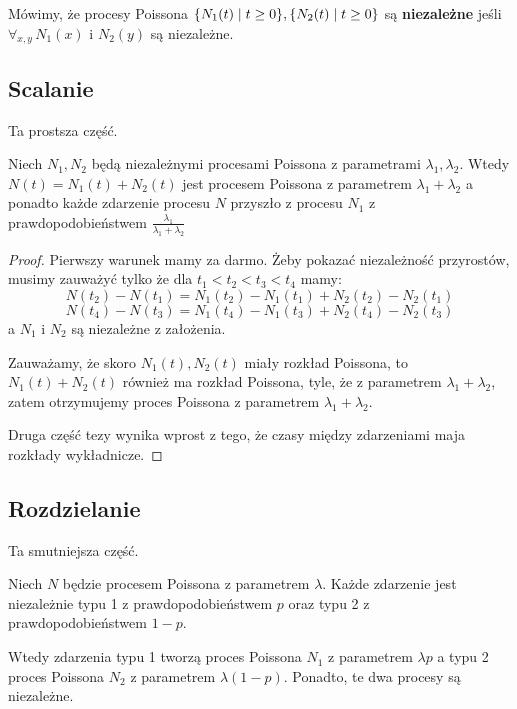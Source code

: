 \begin{definition}
	Mówimy, że procesy Poissona \(\set{N_1(t) \mid t \geq 0}, \set{N_2(t) \mid t \geq 0}\) są \textbf{niezależne} jeśli \(\forall_{x, y} \, N_1(x)\) i \(N_2(y)\) są niezależne.
\end{definition}

\subsection{Scalanie}
Ta prostsza część.
\begin{theorem}[Twierdzenie 8.12 P\&C]
	Niech \( N_1, N_2 \) będą niezależnymi procesami Poissona z parametrami \( \lambda_1, \lambda_2 \).
	Wtedy \( N(t) = N_1(t) + N_2(t) \) jest procesem Poissona z parametrem \( \lambda_1 + \lambda_2 \)
	a ponadto każde zdarzenie procesu \( N \) przyszło z procesu \( N_1 \) z prawdopodobieństwem \( \frac{\lambda_1}{\lambda_1 + \lambda_2} \)
\end{theorem}
\begin{proof}
	Pierwszy warunek mamy za darmo.
	Żeby pokazać niezależność przyrostów, musimy zauważyć tylko że dla \( t_1 < t_2 < t_3 < t_4 \) mamy:
	\[
		N(t_2) - N(t_1) = N_1(t_2) - N_1(t_1) + N_2(t_2) - N_2(t_1)
	\]
	\[
		N(t_4) - N(t_3) = N_1(t_4) - N_1(t_3) + N_2(t_4) - N_2(t_3)
	\]
	a \(N_1\) i \(N_2\) są niezależne z założenia.

	Zauważamy, że skoro \( N_1(t), N_2(t) \) miały rozkład Poissona, to \( N_1(t) + N_2(t) \) również ma rozkład Poissona, tyle, że z parametrem \( \lambda_1 + \lambda_2 \), zatem otrzymujemy proces Poissona z parametrem \( \lambda_1 + \lambda_2 \).

	Druga część tezy wynika wprost z tego, że czasy między zdarzeniami maja rozkłady wykładnicze.
\end{proof}

\subsection{Rozdzielanie}
Ta smutniejsza część.

\begin{theorem}[Twierdzenie 8.13 P\&C]
	Niech \( N \) będzie procesem Poissona z parametrem \( \lambda \).
	Każde zdarzenie jest niezależnie typu 1 z prawdopodobieństwem \( p \) oraz typu 2 z prawdopodobieństwem \( 1 - p \).

	Wtedy zdarzenia typu 1 tworzą proces Poissona \( N_1 \) z parametrem \( \lambda p \) a typu 2 proces Poissona \( N_2 \) z parametrem \( \lambda (1-p) \). Ponadto, te dwa procesy są niezależne.
\end{theorem}

